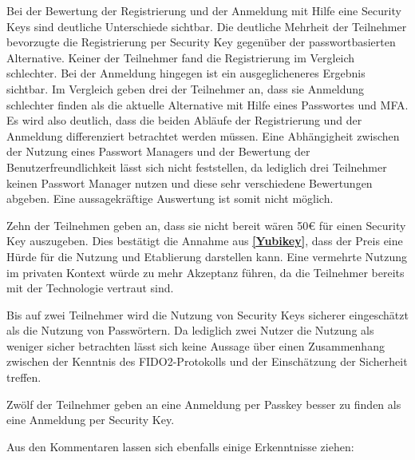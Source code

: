 Bei der Bewertung der Registrierung und der Anmeldung mit Hilfe eine Security Keys sind deutliche Unterschiede sichtbar. Die deutliche Mehrheit der Teilnehmer bevorzugte die Registrierung per Security Key gegenüber der passwortbasierten Alternative. Keiner der Teilnehmer fand die Registrierung im Vergleich schlechter. Bei der Anmeldung hingegen ist ein ausgeglicheneres Ergebnis sichtbar. Im Vergleich geben drei der Teilnehmer an, dass sie Anmeldung schlechter finden als die aktuelle Alternative mit Hilfe eines Passwortes und \ac{MFA}. Es wird also deutlich, dass die beiden Abläufe der Registrierung und der Anmeldung differenziert betrachtet werden müssen. 
Eine Abhängigheit zwischen der Nutzung eines Passwort Managers und der Bewertung der Benutzerfreundlichkeit lässt sich nicht feststellen, da lediglich drei Teilnehmer keinen Passwort Manager nutzen und diese sehr verschiedene Bewertungen abgeben. Eine aussagekräftige Auswertung ist somit nicht möglich. 


Zehn der Teilnehmen geben an, dass sie nicht bereit wären 50€ für einen Security Key auszugeben. Dies bestätigt die Annahme aus \textbf{\ref{Yubikey}}, dass der Preis eine Hürde für die Nutzung und Etablierung darstellen kann. Eine vermehrte Nutzung im privaten Kontext würde zu mehr Akzeptanz führen, da die Teilnehmer bereits mit der Technologie vertraut sind. 

Bis auf zwei Teilnehmer wird die Nutzung von Security Keys sicherer eingeschätzt als die Nutzung von Passwörtern. Da lediglich zwei Nutzer die Nutzung als weniger sicher betrachten lässt sich keine Aussage über einen Zusammenhang zwischen der Kenntnis des FIDO2-Protokolls und der Einschätzung der Sicherheit treffen.

Zwölf der Teilnehmer geben an eine Anmeldung per Passkey besser zu finden als eine Anmeldung per Security Key. 

Aus den Kommentaren lassen sich ebenfalls einige Erkenntnisse ziehen:


